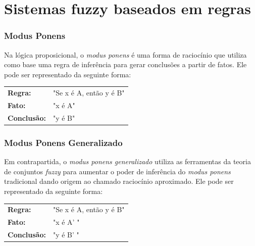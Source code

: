\documentclass{beamer}
\theoremstyle{definition}
\begin{document}

\section{Sistemas fuzzy baseados em regras}

\begin{frame}
\frametitle{Modus Ponens}
Na lógica proposicional, o \textit{modus ponens} é uma forma de raciocínio que utiliza como base uma regra de inferência para gerar conclusões a partir de fatos. Ele pode ser representado da seguinte forma:
\begin{table}[H]
\centering
\label{modus-ponens}
\begin{tabular}{ll}
\textbf{Regra:}      & "Se x é A, então y é B" \\
\textbf{Fato:}      & "x é A"                 \\
\textbf{Conclusão:} & "y é B"                
\end{tabular}
\end{table}
\end{frame}

\begin{frame}
\frametitle{Modus Ponens Generalizado}
Em contrapartida, o \textit{modus ponens generalizado} utiliza as ferramentas da teoria de conjuntos \textit{fuzzy} para aumentar o poder de inferência do \textit{modus ponens} tradicional dando origem ao chamado raciocínio aproximado. Ele pode ser representado da seguinte forma:
\begin{table}[H]
\centering
\label{modus-ponens-generalizado}
\begin{tabular}{ll}
\textbf{Regra:}      & "Se x é A, então y é B" \\
\textbf{Fato:}      & "x é A' "                 \\
\textbf{Conclusão:} & "y é B' "                
\end{tabular}
\end{table}
\end{frame}
\end{document}
